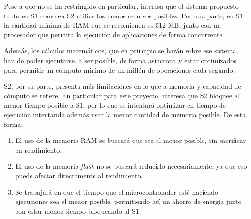 Pese a que no se ha restringido en particular, interesa que el sistema propuesto tanto en \ac{S1} como en \ac{S2} utilice los menos recursos posibles. Por una parte, en \ac{S1} la cantidad mínima de RAM que se recomienda es 512 MB, junto con un procesador que permita la ejecución de aplicaciones de forma concurrente.

Además, los cálculos matemáticos, que en principio se harán sobre ese sistema, han de poder ejecutarse, a ser posible, de forma asíncrona y estar optimizados para permitir un cómputo mínimo de un millón de operaciones cada segundo.

\ac{S2}, por su parte, presenta más limitaciones en lo que a memoria y capacidad de cómputo se refiere. En particular para este proyecto, interesa que \ac{S2} bloquee el menor tiempo posible a \ac{S1}, por lo que se intentará optimizar en tiempo de ejecución intentando además usar la menor cantidad de memoria posible. De esta forma:

\begin{enumerate}
    \item El uso de la memoria \ac{RAM} se buscará que sea el menor posible, sin sacrificar en rendimiento.
    \item El uso de la memoria \textit{flash} no se buscará reducirlo necesariamente, ya que eso puede afectar directamente al rendimiento.
    \item Se trabajará en que el tiempo que el microcontrolador esté haciendo ejecuciones sea el menor posible, permitiendo así un ahorro de energía junto con estar menos tiempo bloqueando al \ac{S1}.
\end{enumerate}